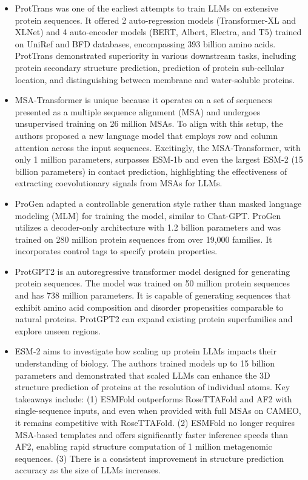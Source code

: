 \begin{itemize}
  \item ProtTrans was one of the earliest attempts to train LLMs on extensive protein sequences. \cite{Elnaggar2021ProtTrans} It offered 2 auto-regression models (Transformer-XL and XLNet) and 4 auto-encoder models (BERT, Albert, Electra, and T5) trained on UniRef and BFD databases, encompassing 393 billion amino acids. ProtTrans demonstrated superiority in various downstream tasks, including protein secondary structure prediction, prediction of protein sub-cellular location, and distinguishing between membrane and water-soluble proteins.
  \item MSA-Transformer is unique because it operates on a set of sequences presented as a multiple sequence alignment (MSA) and undergoes unsupervised training on 26 million MSAs. \cite{Rao2021MSATransformer} To align with this setup, the authors proposed a new language model that employs row and column attention across the input sequences. Excitingly, the MSA-Transformer, with only 1 million parameters, surpasses ESM-1b and even the largest ESM-2 (15 billion parameters) in contact prediction, highlighting the effectiveness of extracting coevolutionary signals from MSAs for LLMs.
  \item ProGen adapted a controllable generation style rather than masked language modeling (MLM) for training the model, similar to Chat-GPT. \cite{Madani2023} ProGen utilizes a decoder-only architecture with 1.2 billion parameters and was trained on 280 million protein sequences from over 19,000 families. It incorporates control tags to specify protein properties.
  \item ProtGPT2 is an autoregressive transformer model designed for generating protein sequences. \cite{Ferruz2022ProtGPT2} The model was trained on 50 million protein sequences and has 738 million parameters. It is capable of generating sequences that exhibit amino acid composition and disorder propensities comparable to natural proteins. ProtGPT2 can expand existing protein superfamilies and explore unseen regions.
  \item ESM-2 aims to investigate how scaling up protein LLMs impacts their understanding of biology. \cite{Lin2023ProteinStructure} The authors trained models up to 15 billion parameters and demonstrated that scaled LLMs can enhance the 3D structure prediction of proteins at the resolution of individual atoms. Key takeaways include: (1) ESMFold outperforms RoseTTAFold and AF2 with single-sequence inputs, and even when provided with full MSAs on CAMEO, it remains competitive with RoseTTAFold. (2) ESMFold no longer requires MSA-based templates and offers significantly faster inference speeds than AF2, enabling rapid structure computation of 1 million metagenomic sequences. (3) There is a consistent improvement in structure prediction accuracy as the size of LLMs increases.
\end{itemize}

